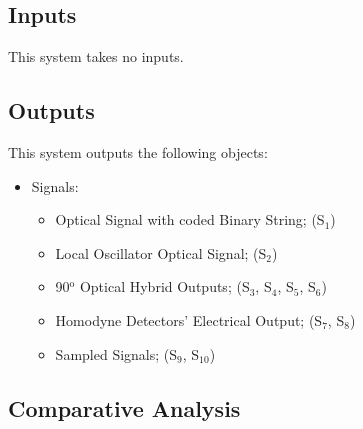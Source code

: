 \subsection*{Inputs}

This system takes no inputs.

\subsection*{Outputs}

This system outputs the following objects:
\begin{itemize}
\item Signals:
\begin{itemize}
\item Optical Signal with coded Binary String; (S$_{1}$)
\item Local Oscillator Optical Signal; (S$_{2}$)
\item 90$^\text{o}$ Optical Hybrid Outputs; (S$_{3}$, S$_{4}$, S$_{5}$, S$_{6}$)
\item Homodyne Detectors' Electrical Output; (S$_{7}$, S$_{8}$)
\item Sampled Signals; (S$_{9}$, S$_{10}$)
\end{itemize}
\end{itemize}

\subsection{Comparative Analysis}


 

